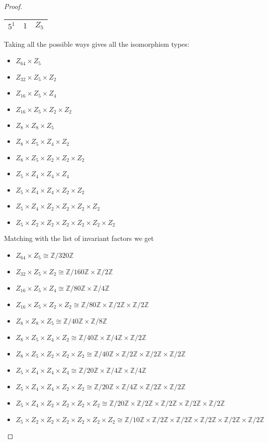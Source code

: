 \documentclass[10pt]{article}
\newcommand{\Z}{\mathbb{Z}}
\begin{document}
\begin{itemize}
\begin{proof}
\begin{item}
\begin{center}
\begin{tabular}{ l c  c  }
		$5^{1}$ & $1$ & $Z_{5}$ \\ \hline
	\hline
  \end{tabular}
\end{center} 

Taking all the possible ways gives all the isomorphism types:

\begin{itemize}
	\item $Z_{64} \times Z_{5}$
	\item $Z_{32} \times Z_{5} \times Z_2 $
	\item $Z_{16} \times Z_{5} \times Z_4$ 
	\item $Z_{16} \times Z_{5} \times Z_2 \times Z_2$
	\item $Z_{8} \times Z_8 \times Z_5$
	\item $Z_{8} \times Z_5 \times Z_4 \times Z_2$
	\item $Z_{8} \times Z_5 \times Z_2 \times Z_2 \times Z_2$
	\item $Z_{5} \times Z_4 \times Z_4 \times Z_4$
	\item $Z_{5} \times Z_4 \times Z_4 \times Z_2 \times Z_2$
	\item $Z_{5} \times Z_4 \times Z_2 \times Z_2 \times Z_2 \times Z_2$
	\item $Z_{5} \times Z_2 \times Z_2 \times Z_2 \times Z_2 \times Z_2 \times Z_2$
\end{itemize}


Matching with the list of invariant factors we get
\begin{itemize}
	\item $Z_{64} \times Z_{5} \cong \Z / 320\Z $
	\item $Z_{32} \times Z_{5} \times Z_2 \cong \Z / 160\Z \times \Z / 2\Z$
	\item $Z_{16} \times Z_{5} \times Z_4 \cong \Z / 80\Z \times \Z / 4\Z$ 
	\item $Z_{16} \times Z_{5} \times Z_2 \times Z_2 \cong \Z / 80\Z \times \Z / 2\Z \times \Z / 2\Z$
	\item $Z_{8} \times Z_8 \times Z_5 \cong \Z / 40\Z \times \Z / 8\Z$
	\item $Z_{8} \times Z_5 \times Z_4 \times Z_2 \cong \Z / 40\Z \times \Z / 4\Z \times \Z / 2\Z$
	\item $Z_{8} \times Z_5 \times Z_2 \times Z_2 \times Z_2 \cong \Z / 40\Z \times \Z / 2\Z \times \Z / 2\Z \times \Z / 2\Z$
	\item $Z_{5} \times Z_4 \times Z_4 \times Z_4 \cong \Z / 20\Z \times \Z / 4\Z \times \Z / 4\Z$
	\item $Z_{5} \times Z_4 \times Z_4 \times Z_2 \times Z_2 \cong \Z / 20\Z \times \Z / 4\Z \times \Z / 2\Z \times \Z / 2\Z$
	\item $Z_{5} \times Z_4 \times Z_2 \times Z_2 \times Z_2 \times Z_2 \cong \Z / 20\Z \times \Z / 2\Z \times \Z / 2\Z \times \Z / 2\Z \times \Z / 2\Z$
	\item $Z_{5} \times Z_2 \times Z_2 \times Z_2 \times Z_2 \times Z_2 \times Z_2 \cong \Z / 10\Z \times \Z / 2\Z \times \Z / 2\Z \times \Z / 2\Z \times \Z / 2\Z \times \Z / 2\Z$
\end{itemize}



\end{item}
\end{proof}
\end{itemize}
\end{document}
